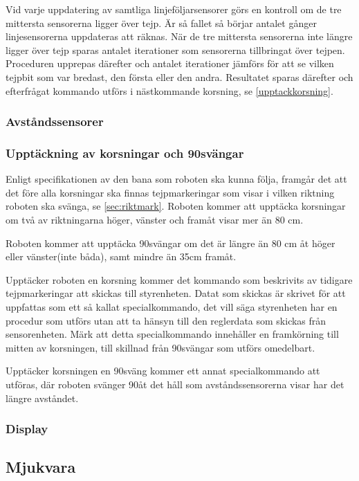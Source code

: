 Vid varje uppdatering av samtliga linjeföljarsensorer görs en kontroll om de tre mittersta sensorerna ligger över tejp. Är så fallet så börjar antalet gånger linjesensorerna uppdateras att räknas. När de tre mittersta sensorerna inte längre ligger över tejp sparas antalet iterationer som sensorerna tillbringat över tejpen. Proceduren upprepas därefter och antalet iterationer jämförs för att se vilken tejpbit som var bredast, den första eller den andra. Resultatet sparas därefter och efterfrågat kommando utförs i nästkommande korsning, se \ref{upptackkorsning}.


\subsubsection{Avståndssensorer}

\subsubsection{Upptäckning av korsningar och 90\degree svängar}
\label{sec:upptackkorsning}
Enligt specifikationen av den bana som roboten ska kunna följa, framgår det att det före alla korsningar ska finnas tejpmarkeringar som visar i vilken riktning roboten ska svänga, se \ref{sec:riktmark}. Roboten kommer att upptäcka korsningar om två av riktningarna höger, vänster och framåt visar mer än 80 cm.

Roboten kommer att upptäcka 90\degree svängar om det är längre än 80 cm åt höger eller vänster(inte båda), samt mindre än 35cm framåt.

Upptäcker roboten en korsning kommer det kommando som beskrivits av tidigare tejpmarkeringar att skickas till styrenheten. Datat som skickas är skrivet för att uppfattas som ett så kallat specialkommando, det vill säga styrenheten har en procedur som utförs utan att ta hänsyn till den reglerdata som skickas från sensorenheten. Märk att detta specialkommando innehåller en framkörning till mitten av korsningen, till skillnad från 90\degree svängar som utförs omedelbart.

Upptäcker korsningen en 90\degree sväng kommer ett annat specialkommando att utföras, där roboten svänger 90\degree åt det håll som avståndssensorerna visar har det längre avståndet.


\subsubsection{Display}


\subsection{Mjukvara}

